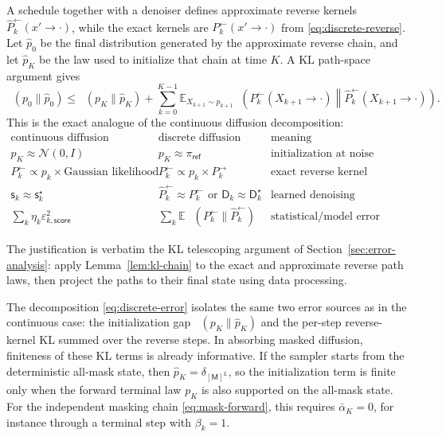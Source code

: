 \documentclass[10pt,a4paper]{amsart}
\numberwithin{equation}{section}
\DeclareMathOperator{\KL}{D_{\mathsf{KL}}}
\newcommand{\E}{\mathbb{E}}
\newcommand{\Id}{I}
\newcommand{\wh}[1]{\widehat{#1}}
\newcommand{\sstar}{\mathsf{s}^{\star}}
\newcommand{\score}{\mathsf{s}}
\newcommand{\dstar}{\mathsf{D}^{\star}}
\newcommand{\denoiser}{\mathsf{D}}
\newcommand{\epsscorek}{\varepsilon_{k,\mathsf{score}}}
\newcommand{\normal}[2]{\mathcal{N}\!\left(#1,#2\right)}
\begin{document}
A schedule together with a denoiser defines approximate reverse kernels
$\wh P_k^{\leftarrow}(x' \to \cdot)$, while the exact kernels are
$P_k^{\leftarrow}(x' \to \cdot)$ from \eqref{eq:discrete-reverse}.  Let
$\wh p_0$ be the final distribution generated by the approximate reverse chain,
and let $\wh p_K$ be the law used to initialize that chain at time $K$.  A KL
path-space argument gives
\begin{equation}\label{eq:discrete-error}
    \KL(p_0\|\wh p_0)
    \leq
    \KL(p_K\|\wh p_K)
    +
    \sum_{k=0}^{K-1}
    \E_{X_{k+1}\sim p_{k+1}}
    \KL\!\left(
    P_k^{\leftarrow}(X_{k+1} \to \cdot)
    \middle\|
    \wh P_k^{\leftarrow}(X_{k+1} \to \cdot)
    \right).
\end{equation}
This is the exact analogue of the continuous diffusion decomposition:
\[
\begin{array}{c|c|c}
\text{continuous diffusion} & \text{discrete diffusion} & \text{meaning}\\
\hline
p_K\approx\normal{0}{\Id} & p_K\approx\pi_{\mathsf{ref}} &
\text{initialization at noise}\\
P_k^{\leftarrow}\propto p_k\times\text{Gaussian likelihood} &
P_k^{\leftarrow}\propto p_k\times P_k^{\to} &
\text{exact reverse kernel}\\
\score_k\approx\sstar_k & \wh P_k^{\leftarrow}\approx P_k^{\leftarrow}
\text{ or }\denoiser_k\approx\dstar_k &
\text{learned denoising information}\\
\sum_k\eta_k\epsscorek^2 &
\sum_k\E\,\KL(P_k^{\leftarrow}\|\wh P_k^{\leftarrow}) &
\text{statistical/model error}
\end{array}
\]

The justification is verbatim the KL telescoping argument of
Section~\ref{sec:error-analysis}: apply Lemma~\ref{lem:kl-chain} to the exact
and approximate reverse path laws, then project the paths to their final state
using data processing.

The decomposition \eqref{eq:discrete-error} isolates the same two error sources
as in the continuous case: the initialization gap $\KL(p_K\|\wh p_K)$ and the
per-step reverse-kernel KL summed over the reverse steps.  In absorbing masked
diffusion, finiteness of these KL terms is already informative.  If the sampler
starts from the deterministic all-mask state, then
$\wh p_K=\delta_{[\mathsf M]^L}$, so the initialization term is finite only when
the forward terminal law $p_K$ is also supported on the all-mask state.  For the
independent masking chain \eqref{eq:mask-forward}, this requires
$\bar\alpha_K=0$, for instance through a terminal step with $\beta_k=1$.
\end{document}
